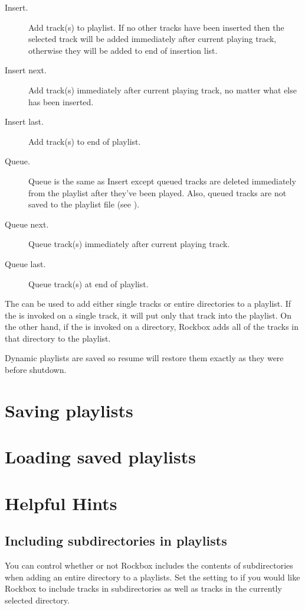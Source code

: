 \begin{description} 
\item [Insert.] Add track(s) to playlist. If no other tracks have been 
  inserted then the selected track will be added immediately after current 
  playing track, otherwise they will be added to end of insertion list. 
  
\item [Insert next.] Add track(s) immediately after current playing 
  track, no matter what else has been inserted. 
  
\item [Insert last.] Add track(s) to end of playlist. 
  
\item [Queue.] Queue is the same as Insert except queued tracks are 
  deleted immediately from the playlist after they've been played. Also, 
  queued tracks are not saved to the playlist file (see 
  ). 
  
\item [Queue next.] Queue track(s) immediately after current playing track.
  
\item [Queue last.] Queue track(s) at end of playlist. 
\end{description}

The  can be used to add either single tracks or 
entire directories to a playlist. If the  is 
invoked on a single track, it will put only that track into the playlist.  
On the other hand, if the  is invoked on a 
directory, Rockbox adds all of the tracks in that directory to the 
playlist.

Dynamic playlists are saved so resume will restore them exactly as they 
were before shutdown.

\section{Saving playlists}

\section{Loading saved playlists}

\section{Helpful Hints}

\subsection{Including subdirectories in playlists} 

You can control whether or not Rockbox includes the contents of 
subdirectories when adding an entire directory to a playlists. 
Set the  setting to  if you would like
Rockbox to include tracks in subdirectories as well as tracks in the 
currently selected directory.
